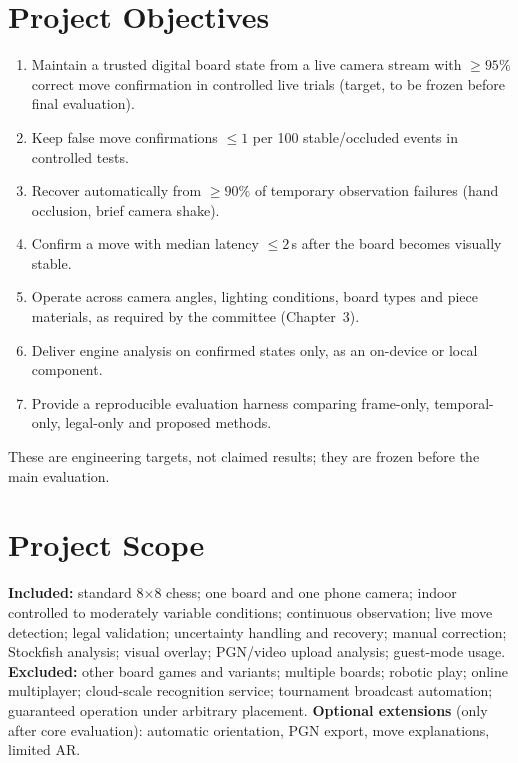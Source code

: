 \section{Project Objectives}
\begin{enumerate}
\item Maintain a trusted digital board state from a live camera stream with $\geq 95\%$ correct move confirmation in controlled live trials (target, to be frozen before final evaluation).
\item Keep false move confirmations $\leq 1$ per 100 stable/occluded events in controlled tests.
\item Recover automatically from $\geq 90\%$ of temporary observation failures (hand occlusion, brief camera shake).
\item Confirm a move with median latency $\leq 2$\,s after the board becomes visually stable.
\item Operate across camera angles, lighting conditions, board types and piece materials, as required by the committee (Chapter~3).
\item Deliver engine analysis on confirmed states only, as an on-device or local component.
\item Provide a reproducible evaluation harness comparing frame-only, temporal-only, legal-only and proposed methods.
\end{enumerate}
These are engineering targets, not claimed results; they are frozen before the main evaluation.

\section{Project Scope}
\textbf{Included:} standard 8$\times$8 chess; one board and one phone camera; indoor controlled to moderately variable
conditions; continuous observation; live move detection; legal validation; uncertainty handling and recovery;
manual correction; Stockfish analysis; visual overlay; PGN/video upload analysis; guest-mode usage.
\textbf{Excluded:} other board games and variants; multiple boards; robotic play; online multiplayer; cloud-scale
recognition service; tournament broadcast automation; guaranteed operation under arbitrary placement.
\textbf{Optional extensions} (only after core evaluation): automatic orientation, PGN export, move explanations, limited AR.

